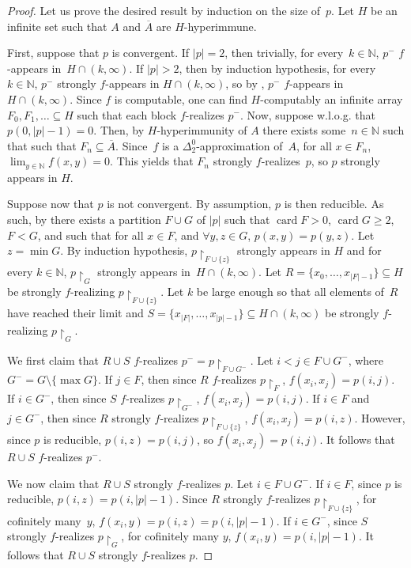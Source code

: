 \documentclass{article}
\newcommand{\uh}{\upharpoonright}
\newcommand{\NN}[0]{\mathbb{N}}
\newcommand{\card}{\operatorname{card}}
\def\NN{\mathbb{N}}
\numberwithin{theorem}{section}
\theoremstyle{definition}
\begin{document}
\begin{proof}
    Let us prove the desired result by induction on the size of~$p$. Let $H$ be an infinite set such that $A$ and $\overline{A}$ are $H$-hyperimmune. 
    
    First, suppose that $p$ is convergent. If $|p| = 2$, then trivially, for every~$k \in \NN$, $p^-$ $f$-appears in~$H \cap (k, \infty)$. If $|p| > 2$, then by induction hypothesis, for every~$k \in \NN$, $p^-$ strongly $f$-appears in $H \cap (k, \infty)$, so by , $p^-$ $f$-appears in $H \cap (k, \infty)$. Since $f$ is computable, one can find $H$-computably an infinite array $F_0, F_1, \dots \subseteq H$ such that each block $f$-realizes $p^-$. Now, suppose w.l.o.g. that $p(0,|p|-1)=0$. Then, by $H$-hyperimmunity of $A$ there exists some~$n \in \NN$ such that such that $F_n \subseteq \overline{A}$. Since~$f$ is a $\Delta^0_2$-approximation of~$A$,  for all $x \in F_n$, $\lim_{y \in \NN} f(x,y) = 0$. This yields that $F_n$ strongly $f$-realizes~$p$, so $p$ strongly appears in $H$.

    Suppose now that $p$ is not convergent. By assumption, $p$ is then reducible. As such, by  there exists a partition $F \cup G$ of $|p|$ such that $\card F > 0$, $\card G \geq 2$, $F < G$, and such that for all $x \in F$, and $\forall y,z \in G$, $p(x,y) = p(y,z)$. Let $z = \min G$. By induction hypothesis, $p \uh_{F \cup \{ z \}}$ strongly appears in $H$ and for every $k \in \NN$, $p \uh_G$ strongly appears in~$H \cap (k, \infty)$. Let $R = \{ x_0, \dots, x_{|F|-1} \} \subseteq H$ be strongly $f$-realizing $p \uh_{F \cup \{ z \}}$. Let $k$ be large enough so that all elements of~$R$ have reached their limit and $S = \{ x_{|F|}, \dots, x_{|p|-1} \} \subseteq H \cap (k, \infty)$ be strongly $f$-realizing $p \uh_G$.

    We first claim that $R \cup S$ $f$-realizes $p^- = p \uh_{F \cup G^-}$. Let $i < j \in F \cup G^-$, where $G^- = G \setminus \{\max G\}$. If $j \in F$, then since $R$ $f$-realizes $p \uh_F$, $f(x_i, x_j) = p(i, j)$. If $i \in G^-$, then since $S$ $f$-realizes $p \uh_{G^-}$, $f(x_i, x_j) = p(i, j)$. If $i \in F$ and $j \in G^-$, then since $R$ strongly $f$-realizes $p \uh_{F \cup \{ z \}}$, $f(x_i,x_j)= p(i,z)$. However, since $p$ is reducible, $p(i,z)=p(i,j)$, so $f(x_i, x_j) = p(i, j)$. It follows that $R \cup S$ $f$-realizes $p^-$.
    
    We now claim that $R \cup S$ strongly $f$-realizes $p$. Let $i \in F \cup G^-$. If $i \in F$, since $p$ is reducible, $p(i, z) = p(i, |p|-1)$. Since $R$ strongly $f$-realizes $p \uh_{F \cup \{ z \}}$, for cofinitely many~$y$, $f(x_i, y) = p(i, z) = p(i, |p|-1)$. If $i \in G^-$, since $S$ strongly $f$-realizes $p \uh_G$, for cofinitely many $y$, $f(x_i,y) = p(i, |p|-1)$. It follows that $R \cup S$ strongly $f$-realizes $p$.
\end{proof}
\end{document}
